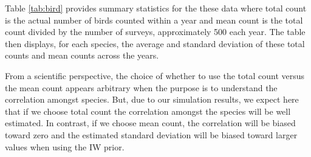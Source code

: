 \documentclass[12pt]{article}
\begin{document}
Table \ref{tab:bird} provides summary statistics for the these data where total count is the actual number of birds counted within a year and mean count is the total count divided by the number of surveys, approximately 500 each year. The table then displays, for each species, the average and standard deviation of these total counts and mean counts across the years.



From a scientific perspective, the choice of whether to use the total count versus the mean count appears arbitrary when the purpose is to understand the correlation amongst species. But, due to our simulation results, we expect here that if we choose total count the correlation amongst the species will be well estimated. In contrast, if we choose mean count, the correlation will be biased toward zero and the estimated standard deviation will be biased toward larger values when using the IW prior. 

%
\end{document}
